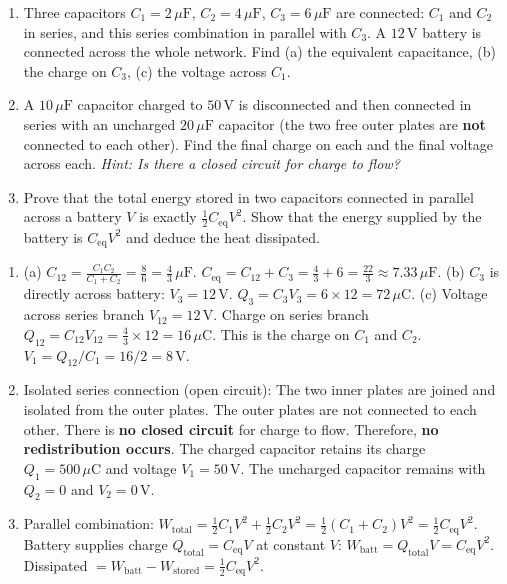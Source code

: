 \documentclass[11pt]{article}
\begin{document}
\begin{exercice}
\begin{enumerate}
\item Three capacitors $C_1=2\,\mu\mathrm{F}$, $C_2=4\,\mu\mathrm{F}$, $C_3=6\,\mu\mathrm{F}$ are connected: $C_1$ and $C_2$ in series, and this series combination in parallel with $C_3$. A $12\,\mathrm{V}$ battery is connected across the whole network. Find (a) the equivalent capacitance, (b) the charge on $C_3$, (c) the voltage across $C_1$.
\item A $10\,\mu\mathrm{F}$ capacitor charged to $50\,\mathrm{V}$ is disconnected and then connected in series with an uncharged $20\,\mu\mathrm{F}$ capacitor (the two free outer plates are \textbf{not} connected to each other). Find the final charge on each and the final voltage across each. \textit{Hint: Is there a closed circuit for charge to flow?}
\item Prove that the total energy stored in two capacitors connected in parallel across a battery $V$ is exactly $\frac{1}{2}C_{\text{eq}}V^2$. Show that the energy supplied by the battery is $C_{\text{eq}}V^2$ and deduce the heat dissipated.
\end{enumerate}
\end{exercice}

\begin{corrige}[Exercise 1]
\begin{enumerate}
\item (a) $C_{12} = \frac{C_1C_2}{C_1+C_2} = \frac{8}{6} = \frac{4}{3}\,\mu\mathrm{F}$. $C_{\text{eq}} = C_{12} + C_3 = \frac{4}{3} + 6 = \frac{22}{3} \approx 7.33\,\mu\mathrm{F}$.
(b) $C_3$ is directly across battery: $V_3 = 12\,\mathrm{V}$. $Q_3 = C_3V_3 = 6 \times 12 = 72\,\mu\mathrm{C}$.
(c) Voltage across series branch $V_{12} = 12\,\mathrm{V}$. Charge on series branch $Q_{12} = C_{12}V_{12} = \frac{4}{3} \times 12 = 16\,\mu\mathrm{C}$. This is the charge on $C_1$ and $C_2$. $V_1 = Q_{12}/C_1 = 16/2 = 8\,\mathrm{V}$.
\item Isolated series connection (open circuit): The two inner plates are joined and isolated from the outer plates. The outer plates are not connected to each other. There is \textbf{no closed circuit} for charge to flow. Therefore, \textbf{no redistribution occurs}. The charged capacitor retains its charge $Q_1 = 500\,\mu\mathrm{C}$ and voltage $V_1 = 50\,\mathrm{V}$. The uncharged capacitor remains with $Q_2 = 0$ and $V_2 = 0\,\mathrm{V}$.
\item Parallel combination: $W_{\text{total}} = \frac{1}{2}C_1V^2 + \frac{1}{2}C_2V^2 = \frac{1}{2}(C_1+C_2)V^2 = \frac{1}{2}C_{\text{eq}}V^2$. Battery supplies charge $Q_{\text{total}} = C_{\text{eq}}V$ at constant $V$: $W_{\text{batt}} = Q_{\text{total}}V = C_{\text{eq}}V^2$. Dissipated $= W_{\text{batt}} - W_{\text{stored}} = \frac{1}{2}C_{\text{eq}}V^2$.
\end{enumerate}
\end{corrige}
\end{document}
